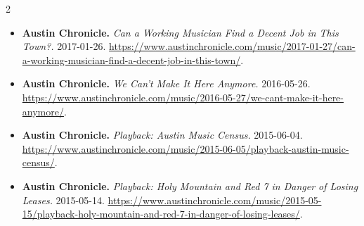 {\begin{multicols}{2}
\begin{itemize}[itemsep=0pt,topsep=1pt,parsep=0pt,partopsep=0pt,leftmargin=1em]
\item \textbf{Austin Chronicle.} \textit{Can a Working Musician Find a Decent Job in This Town?.} 2017-01-26. \url{https://www.austinchronicle.com/music/2017-01-27/can-a-working-musician-find-a-decent-job-in-this-town/}.
\item \textbf{Austin Chronicle.} \textit{We Can’t Make It Here Anymore.} 2016-05-26. \url{https://www.austinchronicle.com/music/2016-05-27/we-cant-make-it-here-anymore/}.
\item \textbf{Austin Chronicle.} \textit{Playback: Austin Music Census.} 2015-06-04. \url{https://www.austinchronicle.com/music/2015-06-05/playback-austin-music-census/}.
\item \textbf{Austin Chronicle.} \textit{Playback: Holy Mountain and Red 7 in Danger of Losing Leases.} 2015-05-14. \url{https://www.austinchronicle.com/music/2015-05-15/playback-holy-mountain-and-red-7-in-danger-of-losing-leases/}.
\end{itemize}

\end{multicols}}
